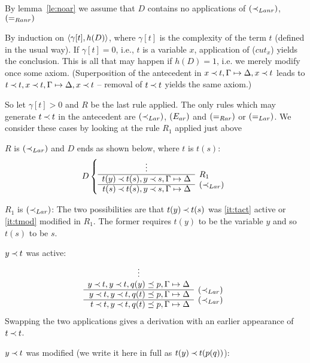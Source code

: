 \begin{PROOF} 
By lemma~\ref{le:noar} %
we assume that $D$ contains no applications of  $(\mathbin{\prec}_{Lanr})$, $(=_{Ranr})$

By induction on $\langle\gamma[t],h(D)\rangle$, where $\gamma[t]$ is the complexity of 
the term $t$ (defined in the usual way). 
If $\gamma[t]=0$, i.e., $t$ is a variable $x$,  application of ($cut_x$) yields the 
conclusion. This is all that may happen if $h(D)=1$, i.e. we merely modify once
some axiom. (Superposition of the antecedent in $x\mathbin{\prec} t,\Gamma\mathrel{\mapsto}\Delta,x\mathbin{\prec} t$ leads to
$t\mathbin{\prec} t,x\mathbin{\prec} t,\Gamma\mathrel{\mapsto}\Delta,x\mathbin{\prec} t$ -- removal of $t\mathbin{\prec} t$ yields the same axiom.)

So let $\gamma[t]>0$ and $R$ be the last rule applied.
 The only rules which may generate $t\mathbin{\prec} t$ in the antecedent
are $(\mathbin{\prec}_{Lar})$, $(E_{ar})$ and $(=_{Rar})$ or
$(=_{Lar})$. We consider these cases by looking at the rule $R_1$ applied just above
%
\begin{LS}
\item $R$ is $(\mathbin{\prec}_{Lar})$ and $D$ ends as shown below, where $t$ is $t(s)$:
\[ D \left \{ \begin{array}{rl}
\multicolumn{1}{c}{\vdots} \\ \cline{1-1}
t(y)\Incl t(s), y\Incl s, \Gamma\Seq\Delta & \rabove{R_1} \\ \cline{1-1}
t(s) \Incl t(s), y\Incl s, \GSD & \rabove{\iLar} \end{array} \right .\]
%
\begin{LSA}
\item $R_1$ is $(\mathbin{\prec}_{Lar})$: The two possibilities are that $t(y)\mathbin{\prec} t(s)$ was
\ref{it:tact} active
or \ref{it:tmod} modified in $R_1$. The former requires $t(y)$ to be the variable
 $y$ and so $t(s)$ to be $s$.
\begin{LSB}
\item\label{it:tact} $y\mathbin{\prec} t$ was active:
\[ \begin{array}{rl}
\multicolumn{1}{c}{\vdots} \\ 
y\Incl t, y\Incl t, q(y)\preceq p, \Gamma\Seq\Delta  \\ \cline{1-1}
y\Incl t, y\Incl t, q(t)\preceq p, \Gamma\Seq\Delta & \rabove{\iLar} \\ \cline{1-1}
t\Incl t, y\Incl t, q(t)\preceq p, \GSD & \rabove{\iLar} \end{array} \]
Swapping the two applications gives a derivation with an earlier
appearance of $t\mathbin{\prec} t$. 
%
\item\label{it:tmod} $y\mathbin{\prec} t$ was modified (we write it here in full as $t(y)\mathbin{\prec} t(p(q))$):

\end{LSB}
\end{LSA}
\end{LS}
\end{PROOF}
